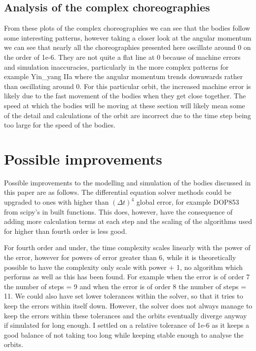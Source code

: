 \documentclass[11pt]{article}
\begin{document}
\restoregeometry
\raggedright

\subsection{Analysis of the complex choreographies}


From these plots of the complex choreographies we can see that the bodies follow some interesting patterns, however taking a closer look at the angular momentum we can see that nearly all the choreographies presented here oscillate around 0 on the order of 1e-6. They are not quite a flat line at 0 because of machine errors and simulation inaccuracies, particularly in the more complex patterns for example Yin\_yang IIa where the angular momentum trends downwards rather than oscillating around 0. For this particular orbit, the increased machine error is likely due to the fast movement of the bodies when they get close together. The speed at which the bodies will be moving at these section will likely mean some of the detail and calculations of the orbit are incorrect due to the time step being too large for the speed of the bodies.


\centering
\section{Possible improvements}
\raggedright

Possible improvements to the modelling and simulation of the bodies discussed in this paper are as follows. The differential equation solver methods could be upgraded to ones with higher than $(\Delta t)^4$ global error, for example DOP853 from scipy's in built functions. This does, however, have the consequence of adding more calculation terms at each step and the scaling of the algorithms used for higher than fourth order is less good.

\smallskip 

For fourth order and under, the time complexity scales linearly with the power of the error, however for powers of error greater than 6, while it is theoretically possible to have the complexity only scale with power + 1, no algorithm which performs as well as this has been found. For example when the error is of order 7 the number of steps = 9 and when the error is of order 8 the number of steps = 11. We could also have set lower tolerances within the solver, so that it tries to keep the errors within itself down. However, the solver does not always manage to keep the errors within these tolerances and the orbits eventually diverge anyway if simulated for long enough. I settled on a relative tolerance of 1e-6 as it keeps a good balance of not taking too long while keeping stable enough to analyse the orbits.
\end{document}
